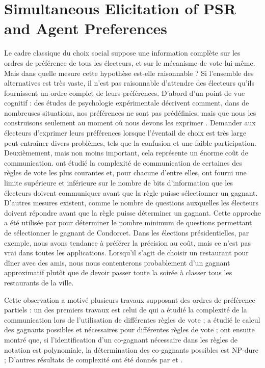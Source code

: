 \section{Simultaneous Elicitation of PSR and Agent Preferences}
	Le cadre classique du choix social suppose une information complète sur les ordres de préférence de tous les électeurs, et sur le mécanisme de vote lui-même. Mais dans quelle mesure cette hypothèse est-elle raisonnable ?
	Si l'ensemble des alternatives est très vaste, il n'est pas raisonnable d'attendre des électeurs qu'ils fournissent un ordre complet de leurs préférences. D'abord d'un point de vue cognitif : des études de psychologie expérimentale décrivent comment, dans de nombreuses situations, nos préférences ne sont pas prédéfinies, mais que nous les construisons seulement au moment où nous devons les exprimer \citep{Lichtenstein2006}. Demander aux électeurs d'exprimer leurs préférences lorsque l'éventail de choix est très large peut entraîner divers problèmes, tels que la confusion et une faible participation.
	Deuxièmement, mais non moins important, cela représente un énorme coût de communication. \citet{Conitzer2005} ont étudié la complexité de communication de certaines des règles de vote les plus courantes et, pour chacune d'entre elles, ont fourni une limite supérieure et inférieure sur le nombre de bits d'information que les électeurs doivent communiquer avant que la règle puisse sélectionner un gagnant. D'autres mesures existent, comme le nombre de questions auxquelles les électeurs doivent répondre avant que la règle puisse déterminer un gagnant. Cette approche a été utilisée par \citet{Procaccia2008} pour déterminer le nombre minimum de questions permettant de sélectionner le gagnant de Condorcet.
	Dans les élections présidentielles, par exemple, nous avons tendance à préférer la précision au coût, mais ce n'est pas vrai dans toutes les applications. Lorsqu'il s'agit de choisir un restaurant pour dîner avec des amis, nous nous contenterons probablement d'un gagnant approximatif plutôt que de devoir passer toute la soirée à classer tous les restaurants de la ville.
	
	Cette observation a motivé plusieurs travaux supposant des ordres de préférence partiels : 
	un des premiers travaux est celui de \citet{Conitzer2005} qui a étudié la complexité de la communication lors de l'utilisation de différentes règles de vote ;
	\citet{Konczak05} a étudié le calcul des gagnants possibles et nécessaires pour différentes règles de vote ;
	\citet{Xia2008} ont ensuite montré que, si l'identification d'un co-gagnant nécessaire dans les règles de notation est polynomiale, la détermination des co-gagnants possibles est NP-dure ;
	D'autres résultats de complexité ont été donnés par \citet{Walsh2007} et \citet{Pini2007}.
	
